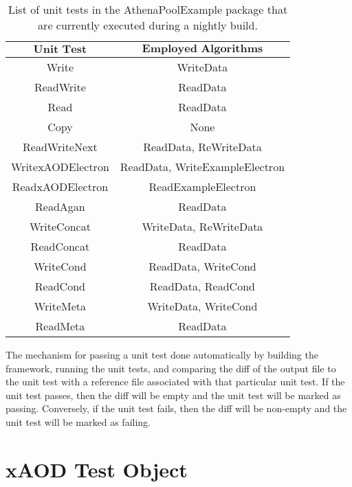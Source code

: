 \begin{table}[h]
    \centering
    \begin{tabular}{|c|c|}
        \hline
        $\textbf{Unit Test}$ & $\textbf{Employed Algorithms}$ \\
        \hline
        Write & WriteData \\
        \hline
        ReadWrite & ReadData \\
        \hline
        Read & ReadData \\
        \hline
        Copy & None \\
        \hline
        ReadWriteNext & ReadData, ReWriteData \\
        \hline
        WritexAODElectron & ReadData, WriteExampleElectron \\
        \hline
        ReadxAODElectron & ReadExampleElectron \\
        \hline
        ReadAgan & ReadData \\
        \hline
        WriteConcat & WriteData, ReWriteData \\
        \hline
        ReadConcat & ReadData \\
        \hline
        WriteCond & ReadData, WriteCond \\
        \hline
        ReadCond & ReadData, ReadCond \\
        \hline
        WriteMeta & WriteData, WriteCond \\
        \hline
        ReadMeta & ReadData \\
        \hline
    \end{tabular}
    \caption{List of unit tests in the AthenaPoolExample package that are currently executed during a nightly build.}
    \label{tab:CI_Unit_Tests}
\end{table}


The mechanism for passing a unit test done automatically by building the framework, running the unit tests, and comparing the diff of the output file to the unit test with a reference file associated with that particular unit test. 
If the unit test passes, then the diff will be empty and the unit test will be marked as passing.
Conversely, if the unit test fails, then the diff will be non-empty and the unit test will be marked as failing.

\section{xAOD Test Object}

